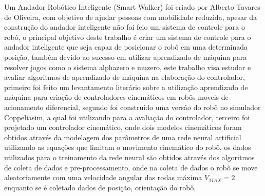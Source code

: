 %
%

Um Andador Robótico Inteligente (Smart Walker) foi criado por Alberto Tavares
de Oliveira, com objetivo de ajudar pessoas com mobilidade reduzida, apesar
da construção do andador inteligente não foi feio um sistema de controle para o
robô, o principal objetivo deste trabalho é criar um  sistema de
controle para o andador inteligente que seja capaz de posicionar o robô
em uma determinada posição, também devido ao sucesso  em utilizar
aprendizado de máquina para resolver jogos como o sistema alphazero e muzero,
este trabalho visa estudar e avaliar algoritmos de aprendizado de máquina
na elaboração do controlador, primeiro foi feito um levantamento
literário sobre a utilização aprendizado de máquina para criação de
controladores cinemáticos em robôs moveis de acionamento diferencial,
segundo foi construído uma versão do robô no simulador Coppeliasim,
a qual foi utilizando para a avaliação do controlador, terceiro foi projetado
um controlador cinemático, onde dois modelos cinemáticos
foram obtidos através da modelagem dos parâmetros de uma rede neural
artificial utilizando as equações que limitam o movimento cinemático do robô,
os dados utilizados para o treinamento da rede neural são obtidos
através dos algoritmos de coleta de dados e pre-processamento,
onde na coleta de dados o robô se move aleatoriamente com
uma velocidade angular das rodas máxima $V_{MAX}=2$
enquanto se é coletado dados de posição, orientação do robô,
